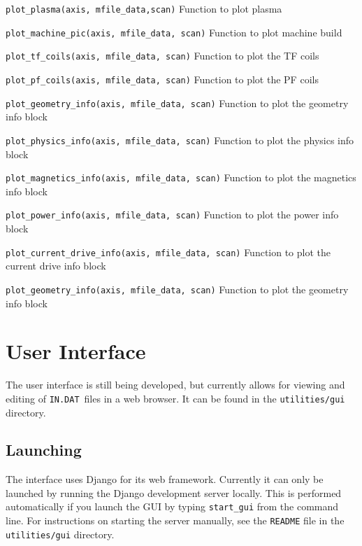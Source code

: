 \documentclass[11pt,a4paper]{report}
\newcommand{\indat}{\mbox{\texttt{IN.DAT}}}
\begin{document}
\begin{description}

\item{\verb|plot_plasma(axis, mfile_data,scan)|} Function to plot plasma

\item{\verb|plot_machine_pic(axis, mfile_data, scan)|} Function to plot machine build

\item{\verb|plot_tf_coils(axis, mfile_data, scan)|} Function to plot the TF coils

\item{\verb|plot_pf_coils(axis, mfile_data, scan)|} Function to plot the PF coils

\item{\verb|plot_geometry_info(axis, mfile_data, scan)|} Function to plot the
  geometry info block

\item{\verb|plot_physics_info(axis, mfile_data, scan)|} Function to plot the
  physics info block

\item{\verb|plot_magnetics_info(axis, mfile_data, scan)|} Function to plot the
  magnetics info block

\item{\verb|plot_power_info(axis, mfile_data, scan)|} Function to plot the
  power info block

\item{\verb|plot_current_drive_info(axis, mfile_data, scan)|} Function to plot
  the current drive info block

\item{\verb|plot_geometry_info(axis, mfile_data, scan)|} Function to plot the
  geometry info block

\end{description}

\section{User Interface}
\label{sec:gui}
The user interface is still being developed, but currently allows for viewing
and editing of \indat\ files in a web browser. It can be found in the
\texttt{utilities/gui} directory.

\subsection{Launching}
The interface uses Django for its web framework. Currently it can only be
launched by running the Django development server locally. This is performed
automatically if you launch the GUI by typing \verb+start_gui+ from the
command line. For instructions on starting the server manually, see the
\verb|README| file in the \texttt{utilities/gui} directory.
\end{document}
